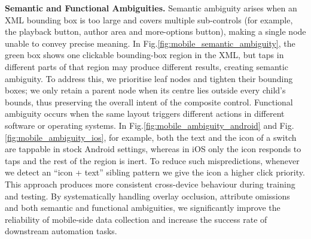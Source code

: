 \textbf{Semantic and Functional Ambiguities.} 
Semantic ambiguity arises when an XML bounding box is too large and covers multiple sub-controls (for example, the playback button, author area and more-options button), making a single node unable to convey precise meaning. In Fig.\ref{fig:mobile_semantic_ambiguity}, the green box shows one clickable bounding-box region in the XML, but taps in different parts of that region may produce different results, creating semantic ambiguity. To address this, we prioritise leaf nodes and tighten their bounding boxes; we only retain a parent node when its centre lies outside every child’s bounds, thus preserving the overall intent of the composite control.
Functional ambiguity occurs when the same layout triggers different actions in different software or operating systems. In Fig.\ref{fig:mobile_ambiguity_android} and Fig.\ref{fig:mobile_ambiguity_ios}, for example, both the text and the icon of a switch are tappable in stock Android settings, whereas in iOS only the icon responds to taps and the rest of the region is inert. To reduce such mispredictions, whenever we detect an “icon + text” sibling pattern we give the icon a higher click priority. This approach produces more consistent cross-device behaviour during training and testing.
By systematically handling overlay occlusion, attribute omissions and both semantic and functional ambiguities, we significantly improve the reliability of mobile-side data collection and increase the success rate of downstream automation tasks.

